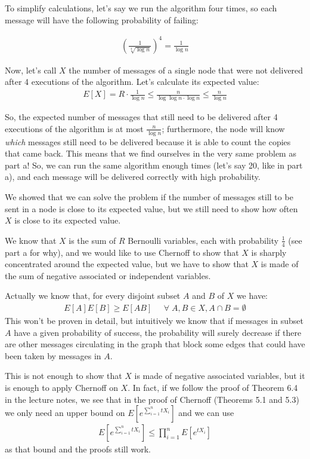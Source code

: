 \documentclass[a4paper,german]{article}
\begin{document}
To simplify calculations, let's say we run the algorithm four times, so 
each message will have the following probability of failing:

\begin{align*}
	\left(\frac{1}{\sqrt[4]{\log n}}\right)^4 = 
	\frac{1}{\log n}
\end{align*}

Now, let's call $X$ the number of messages of a single node that were not
delivered after 4 executions of the algorithm. 
Let's calculate its expected value:
\begin{align*}
 E[X] = R \cdot \frac{1}{\log n} \leq
	\frac{n}{\log \log n \cdot \log n} \leq
	\frac{n}{\log n}
\end{align*}

So, the expected number of messages that still need to be delivered 
after 4 executions of the algorithm is at most $\frac{n}{\log n}$; furthermore,
the node will know \emph{which} messages still need to be delivered
because it is able to count the copies that came back. This means that
we find ourselves in the very same problem as part a! So, we can 
run the same algorithm enough times (let's say 20, like in part a), 
and each message will be delivered correctly with high probability.

We showed that we can solve the problem if the number of 
messages still to be sent in a node is close to its expected value,
but we still need to show how often $X$ is close to its expected value.

We know that $X$ is the sum of $R$ Bernoulli variables, each with probability 
$ \frac{ 1 }{4 }$ (see part a for why), and we would like to use Chernoff
to show that $X$ is sharply concentrated around the expected value, but
we have to show that $X$ is made of the sum of negative associated or independent variables.

Actually we know that, for every disjoint subset $A$ and $B$ of $X$ we have:
\begin{align*}
 E[A]E[B] \geq E[AB] \;\;\;\;\;\forall \; A,B \in X,  A \cap B = \emptyset
\end{align*}
This won't be proven in detail, but intuitively we know that if messages in subset $A$ have 
a given probability of success, the probability will surely decrease if there are other 
messages circulating in the graph that block some edges that could have been taken by messages in $A$.

This is not enough to show that $X$ is made of negative associated variables, but it is enough
to apply Chernoff on $X$. In fact, if we follow the proof of Theorem 6.4 in the lecture notes, 
we see that in the proof of Chernoff (Theorems 5.1 and 5.3) we only need an upper bound
on $E[e^{\sum_{i=1}^n t X_i}]$ and we can use
\begin{align*}
	E[e^{\sum_{i=1}^n t X_i}] \leq \prod_{i=1}^n E[e^{tX_i}]
\end{align*}
as that bound and the proofs still work.
\end{document}
